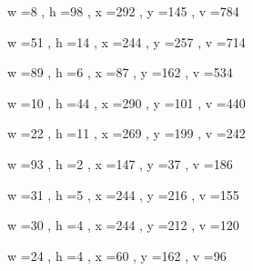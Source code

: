 \documentclass[11pt]{article}
\begin{document}
\par
w =8 , h =98 , x =292 , y =145 , v =784
\par
w =51 , h =14 , x =244 , y =257 , v =714
\par
w =89 , h =6 , x =87 , y =162 , v =534
\par
w =10 , h =44 , x =290 , y =101 , v =440
\par
w =22 , h =11 , x =269 , y =199 , v =242
\par
w =93 , h =2 , x =147 , y =37 , v =186
\par
w =31 , h =5 , x =244 , y =216 , v =155
\par
w =30 , h =4 , x =244 , y =212 , v =120
\par
w =24 , h =4 , x =60 , y =162 , v =96
\par
\newpage
\end{document}
